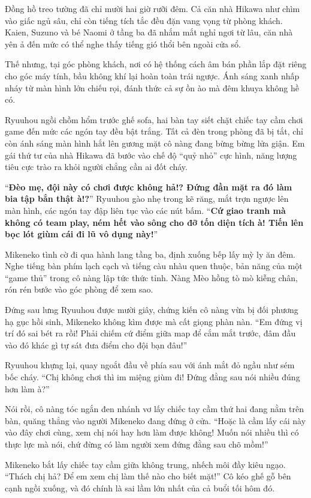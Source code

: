 ﻿\documentclass[../main.tex]{subfiles}
\begin{document}
Đồng hồ treo tường đã chỉ mười hai giờ rưỡi đêm. Cả căn nhà Hikawa như chìm vào giấc ngủ sâu, chỉ còn tiếng tích tắc đều đặn vang vọng từ phòng khách. Kaien, Suzuno và bé Naomi ở tầng ba đã nhắm mắt nghỉ ngơi từ lâu, căn nhà yên ả đến mức có thể nghe thấy tiếng gió thổi bên ngoài cửa sổ.

Thế nhưng, tại góc phòng khách, nơi có hệ thống cách âm bán phần lắp đặt riêng cho góc máy tính, bầu không khí lại hoàn toàn trái ngược. Ánh sáng xanh nhấp nháy từ màn hình lớn chiếu rọi, đánh thức cả sự ồn ào mà đêm khuya không hề có.

Ryuuhou ngồi chồm hổm trước ghế sofa, hai bàn tay siết chặt chiếc tay cầm chơi game đến mức các ngón tay đều bật trắng. Tất cả đèn trong phòng đã bị tắt, chỉ còn ánh sáng màn hình hắt lên gương mặt cô nàng đang bừng bừng lửa giận. Em gái thứ tư của nhà Hikawa đã bước vào chế độ ``quỷ nhỏ'' cực hình, năng lượng tiêu cực trào ra khỏi người chẳng cần ai đốt cháy.

``\textbf{Đèo mẹ, đội này có chơi được không hả!? Đứng đần mặt ra đó làm bia tập bắn thật à!?}'' Ryuuhou gào nhẹ trong kẽ răng, mắt trợn ngược lên màn hình, các ngón tay đập liên tục vào các nút bấm. ``\textbf{Cứ giao tranh mà không có team play, ném hết vào sông cho đỡ tốn diện tích à! Tiến lên bọc lót giùm cái đi lũ vô dụng này!}''

Mikeneko tình cờ đi qua hành lang tầng ba, định xuống bếp lấy mỳ ly ăn đêm. Nghe tiếng bàn phím lạch cạch và tiếng càu nhàu quen thuộc, bản năng của một ``game thủ'' trong cô nàng lập tức thức tỉnh. Nàng Mèo hồng tò mò kiễng chân, rón rén bước vào góc phòng để xem sao.

Đứng sau lưng Ryuuhou được mười giây, chứng kiến cô nàng vừa bị đối phương hạ gục hồi sinh, Mikeneko không kìm được mà cất giọng phàn nàn. ``Em đứng vị trí đó sai bét ra rồi! Phải chiếm cứ điểm giữa map để cắm mắt trước, đâm đầu vào đó khác gì tự sát đưa điểm cho đội bạn đâu!''

Ryuuhou khựng lại, quay ngoắt đầu về phía sau với ánh mắt đỏ ngầu như sém bốc cháy. ``Chị không chơi thì im miệng giùm đi! Đứng đằng sau nói nhiều đúng hơn làm à?''

Nói rồi, cô nàng tóc ngắn đen nhánh vơ lấy chiếc tay cầm thứ hai đang nằm trên bàn, quăng thẳng vào người Mikeneko đang đứng ở cửa. ``Hoặc là cầm lấy cái này vào đây chơi cùng, xem chị nói hay hơn làm được không! Muốn nói nhiều thì có thực lực mà nói, chứ đừng có làm người xem đứng đằng sau chõ mồm!''

Mikeneko bắt lấy chiếc tay cầm giữa không trung, nhếch môi đầy kiêu ngạo. ``Thách chị hả? Để em xem chị làm thế nào cho biết mặt!'' Cô kéo ghế gỗ bên cạnh ngồi xuống, và đó chính là sai lầm lớn nhất của cả buổi tối hôm đó.
\end{document}
